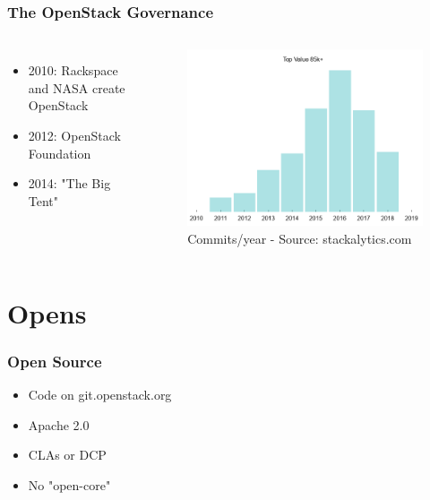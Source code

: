 \documentclass[aspectratio=169,11pt,hyperref={colorlinks=true}]{beamer}
\begin{document}
\begin{frame}
  \frametitle{The OpenStack Governance}
  \begin{columns}
      \begin{itemize}
          \item{2010: Rackspace and NASA create OpenStack}
          \item{2012: OpenStack Foundation}
          \item{2014: "The Big Tent"}
      \end{itemize}
      \begin{figure}
      \begin{center}
        \includegraphics[width=1\textwidth]{graphs/commits.png}
           \caption{Commits/year - Source: stackalytics.com}
      \end{center}
      \end{figure}
  \end{columns}
\end{frame}

\section{Opens}
\begin{frame}
  \frametitle{Open Source}
    \begin{itemize}
        \item{Code on git.openstack.org}
        \item{Apache 2.0}
        \item{CLAs or DCP}
        \item{No "open-core"}
    \end{itemize}
\end{frame}
\end{document}
